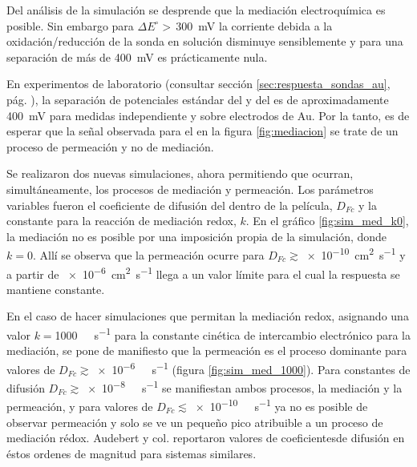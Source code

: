 		Del análisis de la simulación se desprende que la mediación electroquímica es posible. Sin embargo para $\Delta E^\circ\!\!>\,$\SI{300}{\milli\volt} la corriente debida a la oxidación/reducción de la sonda en solución disminuye sensiblemente y para una separación de más de \SI{400}{\milli\volt} es prácticamente nula. %

		En experimentos de laboratorio (consultar sección \ref{sec:respuesta_sondas_au}, pág. \pageref{sec:respuesta_sondas_au}), la separación de potenciales estándar del \ru\space y del \fc\space es de aproximadamente \SI{400}{\milli\volt} para medidas independiente y sobre electrodos de Au. Por la tanto, es de esperar que la señal observada para el \fc\space en la figura \ref{fig:mediacion} se trate de un proceso de permeación y no de mediación.

		Se realizaron dos nuevas simulaciones, ahora permitiendo que ocurran, simultáneamente, los procesos de mediación y permeación. Los parámetros variables fueron el coeficiente de difusión del \fc\space dentro de la película, $D_{Fc}$ y la constante para la reacción de mediación redox, $k$. En el gráfico \ref{fig:sim_med_k0}, la mediación no es posible por una imposición propia de la simulación, donde $k\!=\!0$. Allí se observa que la permeación ocurre para $D_{Fc}\!\!\gtrsim$\SI{e-10}{\square\cm\per\second} y a partir de \SI{e-6}{\square\cm\per\second} llega a un valor límite para el cual la respuesta se mantiene constante.

		En el caso de hacer simulaciones que permitan la mediación redox, asignando una valor $k\!=$\SI{1000}{\per\Molar\per\second} para la constante cinética de intercambio electrónico para la mediación, se pone de manifiesto que la permeación es el proceso dominante para valores de $D_{Fc}\!\gtrsim$\SI{e-6}{\per\Molar\per\second} (figura \ref{fig:sim_med_1000}). Para constantes de difusión $D_{Fc}\!\gtrsim$\SI{e-8}{\per\Molar\per\second} se manifiestan ambos procesos, la mediación y la permeación, y para valores de $D_{Fc}\!\lesssim$\SI{e-10}{\per\Molar\per\second} ya no es posible de observar permeación y solo se ve un pequeño pico atribuible a un proceso de mediación rédox. Audebert y col. reportaron valores de coeficientesde difusión en éstos ordenes de magnitud para sistemas similares\cite{Audebert2015}. 

